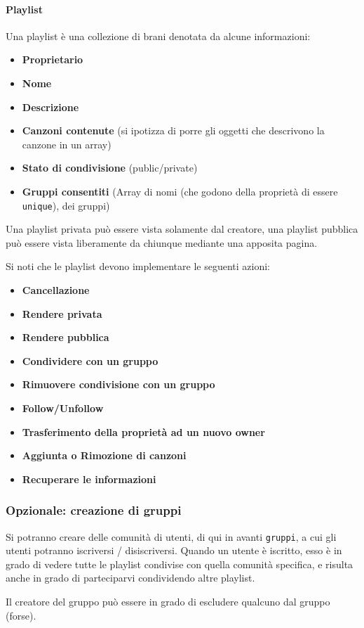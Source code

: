 \paragraph{Playlist} Una playlist è una collezione di brani denotata da alcune informazioni:
\begin{itemize}
    \item \textbf{Proprietario}
    \item \textbf{Nome}
    \item \textbf{Descrizione}
    \item \textbf{Canzoni contenute} (si ipotizza di porre gli oggetti che descrivono la canzone in un array)
    \item \textbf{Stato di condivisione} (public/private)
    \item \textbf{Gruppi consentiti} (Array di nomi (che godono della proprietà di essere \verb|unique|), dei gruppi)
\end{itemize}
Una playlist privata può essere vista solamente dal creatore, una playlist pubblica può essere vista liberamente da chiunque mediante una apposita pagina.

Si noti che le playlist devono implementare le seguenti azioni:\begin{itemize}
    \item \textbf{Cancellazione}
    \item \textbf{Rendere privata}
    \item \textbf{Rendere pubblica}
    \item \textbf{Condividere con un gruppo}
    \item \textbf{Rimuovere condivisione con un gruppo}
    \item \textbf{Follow/Unfollow}
    \item \textbf{Trasferimento della proprietà ad un nuovo owner}
    \item \textbf{Aggiunta o Rimozione di canzoni}
    \item \textbf{Recuperare le informazioni}
\end{itemize}
\subsubsection{Opzionale: creazione di gruppi}
Si potranno creare delle comunità di utenti, di qui in avanti \verb|gruppi|, a cui gli utenti potranno iscriversi / disiscriversi. Quando un utente è iscritto, esso è in grado di vedere tutte le playlist condivise con quella comunità specifica, e risulta anche in grado di parteciparvi condividendo altre playlist.

Il creatore del gruppo può essere in grado di escludere qualcuno dal gruppo (forse).
\newpage